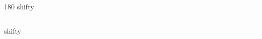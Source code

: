
\begin{frame}
\begin{center}
\begin{turn}{180}
{\fontsize{2.5cm}{1em}\selectfont shifty}
\end{turn}
\vspace{1em}\par  
\hrule
\vspace{1em}\par  
{\fontsize{2.5cm}{1em}\selectfont shifty}
\end{center}
\end{frame}
